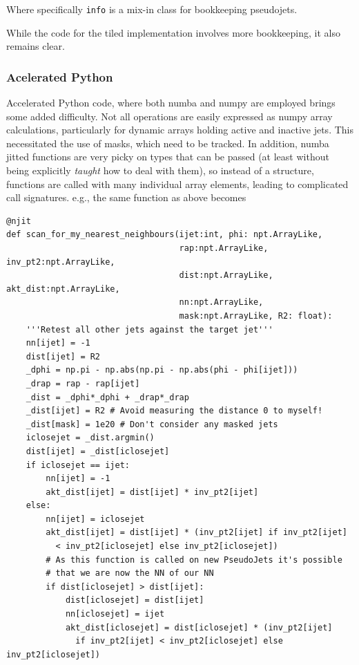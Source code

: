 \documentclass{webofc}
\begin{document}
Where specifically \texttt{info} is a mix-in class for bookkeeping pseudojets.

While the code for the tiled implementation involves more bookkeeping, it also remains clear.

\subsubsection{Acelerated Python}

Accelerated Python code, where both numba and numpy are employed brings some
added difficulty. Not all operations are easily expressed as numpy array
calculations, particularly for dynamic arrays holding active and inactive jets.
This necessitated the use of masks, which need to be tracked. In addition, numba
jitted functions are very picky on types that can be passed (at least without
being explicitly \emph{taught} how to deal with them), so instead of a
structure, functions are called with many individual array elements, leading to
complicated call signatures. e.g., the same function as above becomes

\begin{verbatim}
@njit
def scan_for_my_nearest_neighbours(ijet:int, phi: npt.ArrayLike, 
                                   rap:npt.ArrayLike, inv_pt2:npt.ArrayLike, 
                                   dist:npt.ArrayLike, akt_dist:npt.ArrayLike, 
                                   nn:npt.ArrayLike, 
                                   mask:npt.ArrayLike, R2: float):
    '''Retest all other jets against the target jet'''
    nn[ijet] = -1
    dist[ijet] = R2
    _dphi = np.pi - np.abs(np.pi - np.abs(phi - phi[ijet]))
    _drap = rap - rap[ijet]
    _dist = _dphi*_dphi + _drap*_drap
    _dist[ijet] = R2 # Avoid measuring the distance 0 to myself!
    _dist[mask] = 1e20 # Don't consider any masked jets
    iclosejet = _dist.argmin()
    dist[ijet] = _dist[iclosejet]
    if iclosejet == ijet:
        nn[ijet] = -1
        akt_dist[ijet] = dist[ijet] * inv_pt2[ijet]
    else:
        nn[ijet] = iclosejet
        akt_dist[ijet] = dist[ijet] * (inv_pt2[ijet] if inv_pt2[ijet] 
          < inv_pt2[iclosejet] else inv_pt2[iclosejet])
        # As this function is called on new PseudoJets it's possible
        # that we are now the NN of our NN
        if dist[iclosejet] > dist[ijet]:
            dist[iclosejet] = dist[ijet]
            nn[iclosejet] = ijet
            akt_dist[iclosejet] = dist[iclosejet] * (inv_pt2[ijet] 
              if inv_pt2[ijet] < inv_pt2[iclosejet] else inv_pt2[iclosejet])
\end{verbatim}
\end{document}
